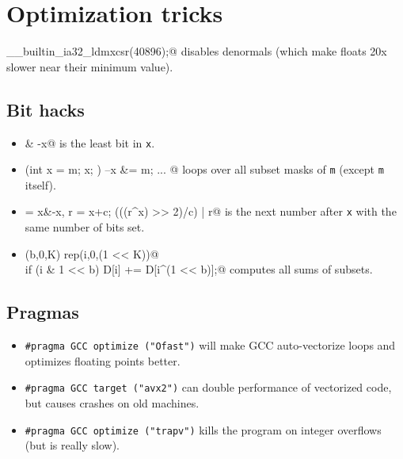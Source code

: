 \section{Optimization tricks}
	\verb@__builtin_ia32_ldmxcsr(40896);@ disables denormals (which make floats 20x slower near their minimum value).
	\subsection{Bit hacks}
		\begin{itemize}
			\item \verb@x & -x@ is the least bit in \texttt{x}.
			\item \verb@for (int x = m; x; ) { --x &= m; ... }@ loops over all subset masks of \texttt{m} (except \texttt{m} itself).
			\item \verb@c = x&-x, r = x+c; (((r^x) >> 2)/c) | r@ is the next number after \texttt{x} with the same number of bits set.
			\item \verb@rep(b,0,K) rep(i,0,(1 << K))@ \\ \verb@  if (i & 1 << b) D[i] += D[i^(1 << b)];@ computes all sums of subsets.
		\end{itemize}
	\subsection{Pragmas}
		\begin{itemize}
			\item \lstinline{#pragma GCC optimize ("Ofast")} will make GCC auto-vectorize loops and optimizes floating points better.
			\item \lstinline{#pragma GCC target ("avx2")} can double performance of vectorized code, but causes crashes on old machines.
			\item \lstinline{#pragma GCC optimize ("trapv")} kills the program on integer overflows (but is really slow).
		\end{itemize}

